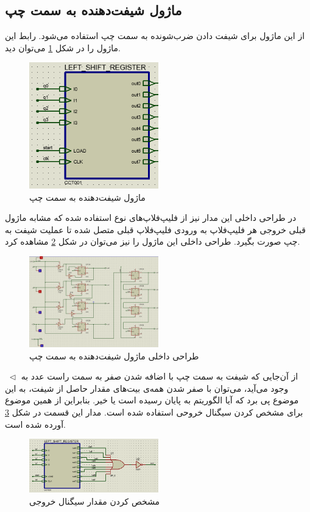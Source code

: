 \documentclass[12pt,onecolumn,a4paper,fleqn]{article}
\begin{document}
	\subsection{ماژول شیفت‌دهنده به سمت چپ}
	از این ماژول برای شیفت دادن ضرب‌شونده به سمت چپ استفاده می‌شود. رابط این ماژول را در شکل \ref{fig:lshiftreg} می‌توان دید.
	\begin{figure}[H]
		\centering
		\includegraphics[width=0.5\textwidth]{source/lshiftreg.png}
		\caption{ماژول شیفت‌دهنده به سمت چپ}
		\label{fig:lshiftreg}
	\end{figure}
در طراحی داخلی این مدار نیز از فلیپ‌فلاپ‌های نوع  استفاده شده که مشابه ماژول قبلی خروجی هر فلیپ‌فلاپ به ورودی فلیپ‌فلاپ قبلی متصل شده تا عملیت شیفت به چپ صورت بگیرد. طراحی داخلی این ماژول را نیز می‌توان در شکل \ref{fig:lshiftreg_inner} مشاهده کرد.
	\begin{figure}[H]
		\centering
		\includegraphics[width=0.5\textwidth]{source/lshiftreg_inner.png}
		\caption{طراحی داخلی ماژول شیفت‌دهنده به سمت چپ}
		\label{fig:lshiftreg_inner}
	\end{figure}
	\noindent
	$\;\triangleleft$
	از آن‌جایی که شیفت به سمت چپ با اضافه شدن صفر به سمت راست عدد به وجود می‌آید، می‌توان با صفر شدن همه‌ی بیت‌های مقدار حاصل از شیفت، به این موضوع پی برد که آیا الگوریتم به پایان رسیده است یا خیر. بنابراین از همین موضوع برای مشخص کردن سیگنال خروحی  استفاده شده است. مدار این قسمت در شکل \ref{fig:end_signal} آورده شده است.
	\begin{figure}[H]
		\centering
		\includegraphics[width=0.5\textwidth]{source/end_signal.png}
		\caption{مشخص کردن مقدار سیگنال خروجی }
		\label{fig:end_signal}
	\end{figure}
\end{document}
